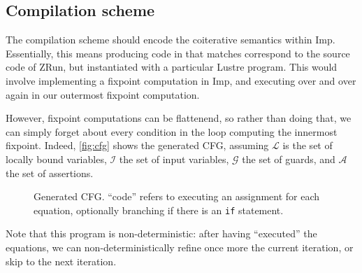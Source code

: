 \documentclass{scrartcl}
\begin{document}
\subsection{Compilation scheme}
The compilation scheme should encode the coiterative semantics within Imp.  Essentially, this
means producing code in that matches correspond to the source code of ZRun, but instantiated with
a particular Lustre program.  This would involve implementing a fixpoint computation in Imp, and
executing over and over again in our outermost fixpoint computation.

However, fixpoint computations can be flattenend, so rather than doing that, we can simply forget
about every condition in the loop computing the innermost fixpoint.  Indeed, \autoref{fig:cfg}
shows the generated CFG, assuming \(\mathcal{L}\) is the set of locally bound variables,
\(\mathcal{I}\) the set of input variables, \(\mathcal{G}\) the set of guards, and
\(\mathcal{A}\) the set of assertions.
\begin{figure}[H]
  \centering
  \caption{Generated CFG.  ``code'' refers to executing an assignment for each equation,
    optionally branching if there is an \texttt{if} statement.}\label{fig:cfg}
\end{figure}

Note that this program is non-deterministic: after having ``executed'' the equations, we can
non-deterministically refine once more the current iteration, or skip to the next iteration.
\end{document}
